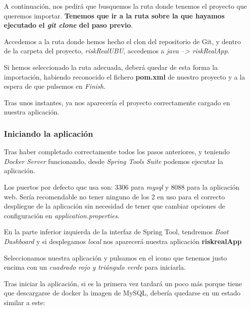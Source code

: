 
A continuación, nos pedirá que busquemos la ruta donde tenemos el proyecto que queremos importar. \textbf{Tenemos que ir a la ruta sobre la que hayamos ejecutado el \textit{git clone} del paso previo}.

Accedemos a la ruta donde hemos hecho el clon del repositorio de Git, y dentro de la carpeta del proyecto, \textit{riskRealUBU}, accedemos a \textit{java --> riskRealApp}.

Si hemos seleccionado la ruta adecuada, deberá quedar de esta forma la importación, habiendo reconocido el fichero \textbf{pom.xml} de nuestro proyecto y a la espera de que pulsemos en \textit{Finish}.


Tras unos instantes, ya nos aparecería el proyecto correctamente cargado en nuestra aplicación.


\subsubsection{Iniciando la aplicación}

Tras haber completado correctamente todos los pasos anteriores, y teniendo \textit{Docker Server} funcionando, desde \textit{Spring Tools Suite} podemos ejecutar la aplicación.

Los puertos por defecto que usa son: 3306 para \textit{mysql} y 8088 para la aplicación web.
Sería recomendable no tener ninguno de los 2 en uso para el correcto despliegue de la aplicación sin necesidad de tener que cambiar opciones de configuración en \textit{application.properties}.

En la parte inferior izquierda de la interfaz de Spring Tool, tendremos \textit{Boot Dashboard} y si desplegamos \textit{local} nos aparecerá nuestra aplicación \textbf{riskrealApp}

Seleccionamos nuestra aplicación y pulsamos en el icono que tenemos justo encima con un \textit{cuadrado rojo y triángulo verde} para iniciarla.


Tras iniciar la aplicación, si es la primera vez tardará un poco más porque tiene que descargarse de docker la imagen de MySQL, debería quedarse en un estado similar a este:

